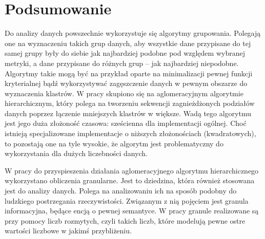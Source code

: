 \documentclass[a4paper,twoside,12pt]{book}
\begin{document}

\chapter{Podsumowanie}



Do analizy danych powszechnie wykorzystuje się algorytmy grupowania. Polegają one na wyznaczeniu takich grup danych, aby wszystkie dane przypisane do tej samej grupy były do siebie jak najbardziej podobne pod względem wybranej metryki, a dane przypisane do różnych grup -- jak najbardziej niepodobne.
%
Algorytmy takie mogą być na przykład oparte na minimalizacji pewnej funkcji kryterialnej bądź wykorzystywać zagęszczenie danych w pewnym obszarze do wyznaczenia klastrów. W pracy skupiono się na aglomeracyjnym algorytmie hierarchicznym, który polega na tworzeniu sekwencji zagnieżdżonych podziałów danych poprzez łączenie mniejszych klastrów w większe. Wadą tego algorytmu jest jego duża złożoność czasowa: sześcienna dla implementacji ogólnej. Choć istnieją specjalizowane implementacje o niższych złożonościach (kwadratowych), to pozostają one na tyle wysokie, że algorytm jest problematyczny do wykorzystania dla dużych liczebności danych.

W pracy do przyspieszenia działania aglomeracyjnego algorytmu hierarchicznego wykorzystano obliczenia granularne.
Jest to dziedzina, która również stosowana jest do analizy danych. Polega na analizowaniu ich na sposób podobny do ludzkiego postrzegania rzeczywistości. Związanym z nią pojęciem jest granula informacyjna, będące encją o pewnej semantyce. W pracy granule realizowane są przy pomocy liczb rozmytych, czyli takich liczb, które modelują pewne ostre wartości liczbowe w jakimś przybliżeniu.
\end{document}
